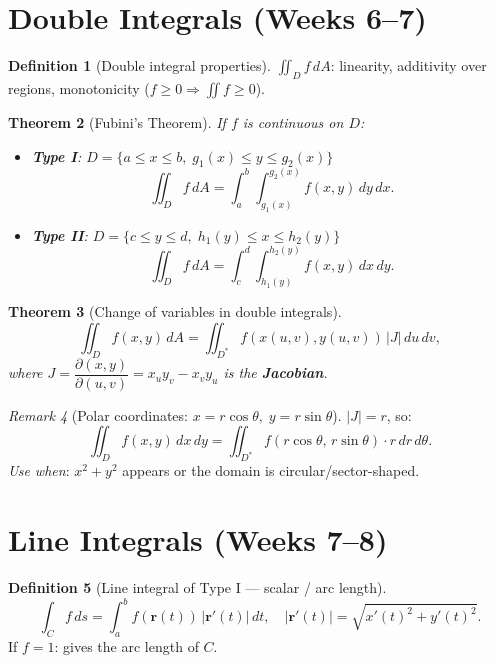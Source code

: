 \documentclass[12pt,a4paper]{article}
\newtheorem{theorem}{Theorem}[section]
\theoremstyle{definition}
\newtheorem{definition}[theorem]{Definition}
\theoremstyle{remark}
\newtheorem{remark}[theorem]{Remark}
\begin{document}
\section{Double Integrals (Weeks 6--7)}

\begin{definition}[Double integral properties]
$\iint_D f\,dA$: linearity, additivity over regions, monotonicity ($f\ge 0\Rightarrow\iint f\ge 0$).
\end{definition}

\begin{theorem}[Fubini's Theorem]
If $f$ is continuous on $D$:
\begin{itemize}
  \item \textbf{Type I}: $D=\{a\le x\le b,\;g_1(x)\le y\le g_2(x)\}$
    \[\iint_D f\,dA = \int_a^b\!\!\int_{g_1(x)}^{g_2(x)} f(x,y)\,dy\,dx.\]
  \item \textbf{Type II}: $D=\{c\le y\le d,\;h_1(y)\le x\le h_2(y)\}$
    \[\iint_D f\,dA = \int_c^d\!\!\int_{h_1(y)}^{h_2(y)} f(x,y)\,dx\,dy.\]
\end{itemize}
\end{theorem}

\begin{theorem}[Change of variables in double integrals]
\[
  \iint_D f(x,y)\,dA = \iint_{D^*} f(x(u,v),y(u,v))\,|J|\,du\,dv,
\]
where $J = \dfrac{\partial(x,y)}{\partial(u,v)} = x_u y_v - x_v y_u$ is the \textbf{Jacobian}.
\end{theorem}

\begin{remark}[Polar coordinates: $x=r\cos\theta,\;y=r\sin\theta$]
$|J|=r$, so:
\[
  \iint_D f(x,y)\,dx\,dy = \iint_{D^*} f(r\cos\theta,\,r\sin\theta)\cdot r\,dr\,d\theta.
\]
\textit{Use when}: $x^2+y^2$ appears or the domain is circular/sector-shaped.
\end{remark}

\section{Line Integrals (Weeks 7--8)}

\begin{definition}[Line integral of Type I --- scalar / arc length]
\[
  \int_C f\,ds = \int_a^b f(\mathbf{r}(t))\,|\mathbf{r}'(t)|\,dt,
  \quad |\mathbf{r}'(t)|=\sqrt{x'(t)^2+y'(t)^2}.
\]
If $f=1$: gives the arc length of $C$.
\end{definition}
\end{document}
